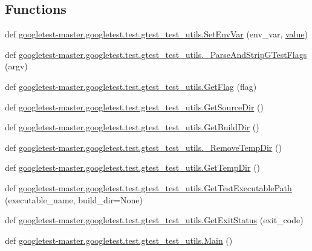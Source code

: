 \subsection*{Functions}
\begin{DoxyCompactItemize}
\item 
def \mbox{\hyperlink{namespacegoogletest-master_1_1googletest_1_1test_1_1gtest__test__utils_a98c2298a9af2f408668f394fe2759587}{googletest-\/master.\+googletest.\+test.\+gtest\+\_\+test\+\_\+utils.\+Set\+Env\+Var}} (env\+\_\+var, \mbox{\hyperlink{_obj__test_2lib_2googletest-master_2googlemock_2test_2gmock-matchers__test_8cc_a337b8a670efc0b086ad3af163f3121b6}{value}})
\item 
def \mbox{\hyperlink{namespacegoogletest-master_1_1googletest_1_1test_1_1gtest__test__utils_a8a23cf0aed6803aa166494ee4d4194ac}{googletest-\/master.\+googletest.\+test.\+gtest\+\_\+test\+\_\+utils.\+\_\+\+Parse\+And\+Strip\+G\+Test\+Flags}} (argv)
\item 
def \mbox{\hyperlink{namespacegoogletest-master_1_1googletest_1_1test_1_1gtest__test__utils_a6e7b42296bb66f80f0e1108e7c31e3e7}{googletest-\/master.\+googletest.\+test.\+gtest\+\_\+test\+\_\+utils.\+Get\+Flag}} (flag)
\item 
def \mbox{\hyperlink{namespacegoogletest-master_1_1googletest_1_1test_1_1gtest__test__utils_a5b2487a7b4864fb1c1fd6d5c283062ef}{googletest-\/master.\+googletest.\+test.\+gtest\+\_\+test\+\_\+utils.\+Get\+Source\+Dir}} ()
\item 
def \mbox{\hyperlink{namespacegoogletest-master_1_1googletest_1_1test_1_1gtest__test__utils_aa627634af4273dc9a9a5dc521fe745be}{googletest-\/master.\+googletest.\+test.\+gtest\+\_\+test\+\_\+utils.\+Get\+Build\+Dir}} ()
\item 
def \mbox{\hyperlink{namespacegoogletest-master_1_1googletest_1_1test_1_1gtest__test__utils_a17a34558d8d7327b9b8c0e9f3cf17f19}{googletest-\/master.\+googletest.\+test.\+gtest\+\_\+test\+\_\+utils.\+\_\+\+Remove\+Temp\+Dir}} ()
\item 
def \mbox{\hyperlink{namespacegoogletest-master_1_1googletest_1_1test_1_1gtest__test__utils_a2710dd8832dbb21fab8283e6b997f63c}{googletest-\/master.\+googletest.\+test.\+gtest\+\_\+test\+\_\+utils.\+Get\+Temp\+Dir}} ()
\item 
def \mbox{\hyperlink{namespacegoogletest-master_1_1googletest_1_1test_1_1gtest__test__utils_a78bbc69ac699e750a6a29188caa643c4}{googletest-\/master.\+googletest.\+test.\+gtest\+\_\+test\+\_\+utils.\+Get\+Test\+Executable\+Path}} (executable\+\_\+name, build\+\_\+dir=None)
\item 
def \mbox{\hyperlink{namespacegoogletest-master_1_1googletest_1_1test_1_1gtest__test__utils_a33b857c245336dc42604a941dbecc15d}{googletest-\/master.\+googletest.\+test.\+gtest\+\_\+test\+\_\+utils.\+Get\+Exit\+Status}} (exit\+\_\+code)
\item 
def \mbox{\hyperlink{namespacegoogletest-master_1_1googletest_1_1test_1_1gtest__test__utils_a09393458111e351256e56556175f31be}{googletest-\/master.\+googletest.\+test.\+gtest\+\_\+test\+\_\+utils.\+Main}} ()
\end{DoxyCompactItemize}
